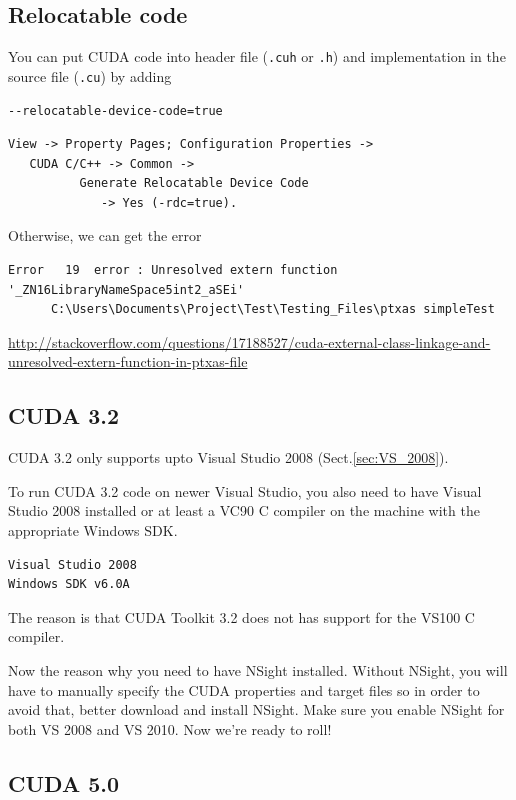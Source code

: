 \subsection{Relocatable code}

You can put CUDA code into header file (\verb!.cuh! or \verb!.h!) and
implementation in the source file (\verb!.cu!) by adding 

\begin{verbatim}
--relocatable-device-code=true
\end{verbatim}

\begin{verbatim}
View -> Property Pages; Configuration Properties -> 
   CUDA C/C++ -> Common ->
          Generate Relocatable Device Code 
             -> Yes (-rdc=true).
\end{verbatim}

Otherwise, we can get the error
\begin{verbatim}
Error   19  error : Unresolved extern function '_ZN16LibraryNameSpace5int2_aSEi'
      C:\Users\Documents\Project\Test\Testing_Files\ptxas simpleTest
\end{verbatim}

\url{http://stackoverflow.com/questions/17188527/cuda-external-class-linkage-and-unresolved-extern-function-in-ptxas-file}

\subsection{CUDA 3.2}

CUDA 3.2 only supports upto Visual Studio 2008 (Sect.\ref{sec:VS_2008}).

To run CUDA 3.2 code on newer Visual Studio, you also need to have Visual Studio
2008 installed or at least a VC90 C compiler on the machine with the appropriate
Windows SDK.
\begin{verbatim}
Visual Studio 2008
Windows SDK v6.0A
\end{verbatim}
The reason is that CUDA Toolkit 3.2 does not has support for the
VS100 C compiler.

Now the reason why you need to have NSight installed. Without NSight, you will
have to manually specify the CUDA properties and target files so in order to
avoid that, better download and install NSight. Make sure you enable NSight for
both VS 2008 and VS 2010. Now we're ready to roll!

\subsection{CUDA 5.0}

